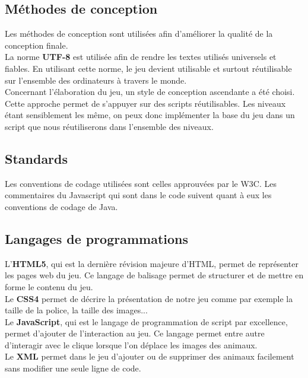 \documentclass{article}
\begin{document}
\subsection{M\'ethodes de conception}
\hspace*{0.6cm}Les m\'ethodes de conception sont utilis\'ees afin d'am\'eliorer la qualit\'e de la conception finale.
\vspace{0.5cm}\\
\hspace*{0.6cm}La norme \textbf{UTF-8} est utilis\'ee afin de rendre les textes utilis\'es universels et fiables. En utilisant cette norme, le jeu devient utilisable et surtout r\'eutilisable sur l'ensemble des ordinateurs \`a travers le monde.
\vspace{0.5cm}\\
\hspace*{0.6cm}Concernant l'\'elaboration du jeu, un style de conception ascendante a \'et\'e choisi. Cette approche permet de s'appuyer sur des scripts r\'eutilisables. Les niveaux \'etant sensiblement les m\^eme, on peux donc impl\'ementer la base du jeu dans un script que nous r\'eutiliserons dans l'ensemble des niveaux.

\subsection{Standards}

\hspace*{0.6cm}Les conventions de codage utilis\'ees sont celles approuv\'ees par le W3C. Les commentaires du Javascript qui sont dans le code suivent quant \`a eux les conventions de codage de Java.

\subsection{Langages de programmations}

\hspace*{0.6cm}L'\textbf{HTML5}, qui est la derni\`ere r\'evision majeure d'HTML, permet de repr\'esenter les pages web du jeu. Ce langage de balisage permet de structurer et de mettre en forme le contenu du jeu.\\
\hspace*{0.6cm}Le \textbf{CSS4} permet de d\'ecrire la pr\'esentation de notre jeu comme par exemple la taille de la police, la taille des images...\\
\hspace*{0.6cm}Le \textbf{JavaScript}, qui est le langage de programmation de script par excellence, permet d'ajouter de l'interaction au jeu. Ce langage permet entre autre d'interagir avec le clique lorsque l'on d\'eplace les images des animaux.\\
\hspace*{0.6cm}Le \textbf{XML} permet dans le jeu d'ajouter ou de supprimer des animaux facilement sans modifier une seule ligne de code.
\end{document}
